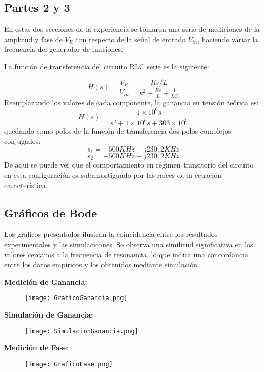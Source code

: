 \documentclass[a4paper,12pt]{article}
\begin{document}
\subsection{Partes 2 y 3}
\hspace{1cm} En estas dos secciones de la experiencia se tomaron una serie de mediciones 
de la amplitud y fase de $V_R$ con respecto de la señal de entrada $V_{in}$, haciendo variar la frecuencia del generador de funciones.

\hspace{1cm} La función de transferencia del circuito RLC serie es la siguiente:

\[H(s) = \frac{V_R}{V_{in}} = \frac{Rs/L}{s^2+\frac{Rs}{L}+\frac{1}{LC}}\]
Reemplazando los valores de cada componente, 
la ganancia en tensión teórica es:\\
\[H(s) = \frac{1\times10^6s}{s^2+1\times10^6s+303\times10^9}\]
quedando como polos de la función 
de transferencia dos polos complejos conjugados:
\[s_1 = -500KHz + j230,2KHz\]
\[s_2 = -500KHz - j230,2KHz\]
De aqui se puede ver que el comportamiento en régimen transitorio del circuito en esta configuración es subamortiguado por las raíces de la ecuación característica.

\subsection{Gráficos de Bode}
\hspace{1cm}Los gráficos presentados ilustran la coincidencia entre los resultados experimentales y las simulacicones. Se observa una similitud significativa en los valores cercanos a la frecuencia de resonancia, lo que indica una concordancia entre los datos empíricos y los obtenidos mediante simulación.

\textbf{Medición de Ganancia:}

\begin{figure}[H]
    \centering
    \texttt{[image: GraficoGanancia.png]}
\end{figure}

\textbf{Simulación de Ganancia:}
\begin{figure}[H]
    \centering
    \texttt{[image: SimulacionGanancia.png]}
\end{figure}

\vspace{5cm}

\textbf{Medición de Fase}:

\begin{figure}[H]
    \centering
    \texttt{[image: GraficoFase.png]}
\end{figure}
\end{document}

